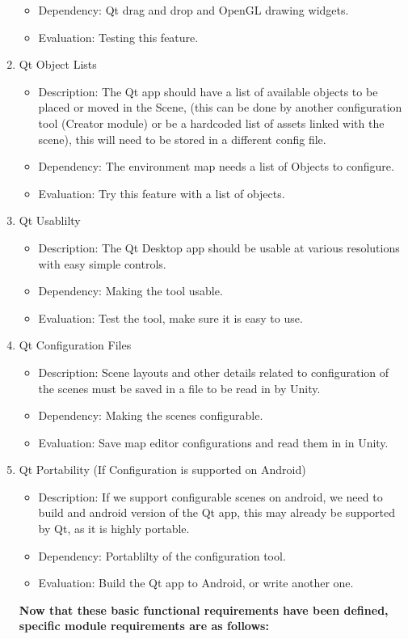 \documentclass[a4paper,10pt]{article}
\begin{document}
\begin{enumerate}
\begin{itemize}
		 \item Dependency:  Qt drag and drop and OpenGL drawing widgets. 
		 \item Evaluation:  Testing this feature.
		\end{itemize}
		\item Qt Object Lists
		\begin{itemize}
		 \item Description: The Qt app should have a list of available objects to be placed or moved in the Scene, (this can be done by another configuration tool 
		 (Creator module) or be a hardcoded list of assets linked with the scene), this will need to be stored in a different config file. 
		 \item Dependency:  The environment map needs a list of Objects to configure. 
		 \item Evaluation:  Try this feature with a list of objects.
		\end{itemize}

		\item Qt Usablilty
		\begin{itemize}
		 \item Description: The Qt Desktop app should be usable at various resolutions with easy simple controls. 
		 \item Dependency:  Making the tool usable.
		 \item Evaluation:  Test the tool, make sure it is easy to use.
		\end{itemize}
		
		\item Qt Configuration Files
		\begin{itemize}
		 \item Description: Scene layouts and other details related to configuration of the scenes must be saved in a file to be read in by Unity.
		 \item Dependency:  Making the scenes configurable.
		 \item Evaluation:  Save map editor configurations and read them in in Unity.
		\end{itemize}
		\item Qt Portability (If Configuration is supported on Android)
		\begin{itemize}
		 \item Description: If we support configurable scenes on android, we need to build and android version of the Qt app, this may already be supported by Qt, as it is highly portable.
		 \item Dependency:  Portablilty of the configuration tool.
		 \item Evaluation:  Build the Qt app to Android, or write another one. 
		\end{itemize}
		\textbf{ Now that these basic functional requirements have been defined, specific module requirements are as follows:}
		

\end{enumerate}
\end{document}
